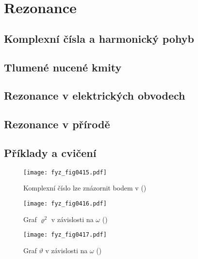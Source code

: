 \setchaptertoc
\chapter{Rezonance}\label{fyz:IchapXXIII}

  \section{Komplexní čísla a harmonický pohyb}\label{fyz:IchapXXIIIsecI}
  \section{Tlumené nucené kmity}\label{fyz:IchapXXIIIsecII}
  \section{Rezonance v elektrických obvodech}\label{fyz:IchapXXIIIsecIII}
  \section{Rezonance v přírodě}\label{fyz:IchapXXIIIsecIV}
  \section{Příklady a cvičení}\label{fyz:IchapXXIIIsecV}

  \begin{figure}[ht!] %
    \centering
    \texttt{[image: fyz\_fig0415.pdf]}
    \caption{Komplexní číslo lze znázornit bodem v 
             (\cite[s.~309]{Feynman01})}
    \label{fyz:fig0415}
  \end{figure}

  \begin{figure}[ht!] %
    \centering
    \texttt{[image: fyz\_fig0416.pdf]}
    \caption{Graf \(\varrho^2\) v závislosti na \(\omega\)
             (\cite[s.~313]{Feynman01})}
    \label{fyz:fig0416}
  \end{figure}

  \begin{figure}[ht!] %
    \centering
    \texttt{[image: fyz\_fig0417.pdf]}
    \caption{Graf \(\vartheta\) v závislosti na \(\omega\)
             (\cite[s.~314]{Feynman01})}
    \label{fyz:fig0417}
  \end{figure}

